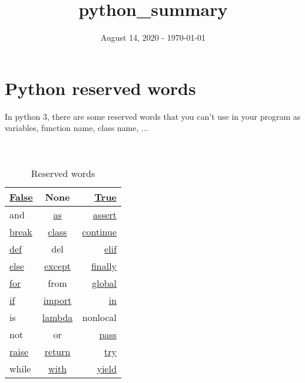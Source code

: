 \documentclass[a4paper, 12pt, titlepage]{scrartcl} %
\title{python\_summary}
\author{}
\date{August 14, 2020 - \today}
\begin{document}
\maketitle
\newpage

\tableofcontents

\newpage
\section{Python reserved words}
In python 3, there are some reserved words that you can't use in your program as variables, function name, class name, ... \\ \\ \\

\begin{table}[h]
\begin{center}
{\renewcommand{\arraystretch}{2} %
{\setlength{\tabcolsep}{1.5cm} %
\begin{tabular}{|l|c|r|}
  \hline
  \hyperref[subsec:Bool]{False} & None & \hyperref[subsec:Bool]{True} \\
  \hline
  and & \hyperref[As]{as} & \hyperref[subsec:Assertion]{assert} \\
  \hline
  \hyperref[subsec:BCPR]{break} & \hyperref[sec:Class]{class} & \hyperref[subsec:BCPR]{continue} \\
  \hline
  \hyperref[sec:Function]{def} & del & \hyperref[IEE]{elif} \\
  \hline
  \hyperref[IEE]{else} & \hyperref[TEEF]{except} & \hyperref[TEEF]{finally} \\
  \hline
  \hyperref[subsec:For]{for} & from & \hyperref[subsec:Global]{global} \\
  \hline
  \hyperref[IEE]{if} & \hyperref[subsec:Import]{import} & \hyperref[subsec:ListComprehension]{in} \\
  \hline
  is & \hyperref[subsec:Lambda]{lambda} & nonlocal \\
  \hline 
  not & or & \hyperref[subsec:BCPR]{pass} \\
  \hline 
  \hyperref[Raise]{raise} & \hyperref[subsec:BCPR]{return} & \hyperref[TEEF]{try} \\
  \hline
  while & \hyperref[subsec:ContextManager]{with} & \hyperref[sec:Generators]{yield} \\
  \hline
\end{tabular}}}
\end{center}
\caption{Reserved words}
\end{table}
\end{document}

